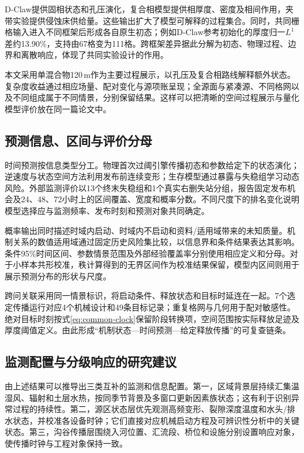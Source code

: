 D-Claw提供固相状态和孔压演化，复合相模型提供相厚度、密度及相间作用，夹带实验提供侵蚀床供给量。这些输出扩大了模型可解释的过程集合。同时，共同栅格输入进入不同框架后形成各自原生初态；例如D-Claw参考初始化的厚度归一$L^1$差约13.90\%，支持由67格变为111格。跨框架差异据此分解为初态、物理过程、边界和离散响应，体现了共同实验设计的作用。

本文采用单混合物120\,m作为主要过程展示，以孔压及复合相路线解释额外状态。复杂度收益通过相应场量、配对变化与源项账呈现；全源面与紧凑源、不同格网以及不同组成属于不同情景，分别保留结果。这样可以把清晰的空间过程展示与量化模型评价放在同一篇论文中。

\subsection{预测信息、区间与评价分母}
时间预测按信息类型分工。物理首次过阈引擎传播初态和参数给定下的状态演化；逆速度与状态空间方法利用发布前连续变形；生存模型通过暴露与失稳组学习动态风险。外部监测评价以13个终末失稳组和1个真实右删失站分组，报告固定发布机会及24、48、72小时上的区间覆盖、宽度和概率分数。不同尺度下的排名变化说明模型选择应与监测频率、发布时刻和预测对象共同确定。

概率输出同时描述时域内启动、时域内不启动和资料/适用域带来的未知质量。机制关系的数值适用域通过固定历史风险集比较，以信息界和条件结果表达其影响。条件95\%时间区间、参数情景范围及外部经验覆盖率分别使用相应定义和分母。对于小样本共形校准，秩计算得到的无界区间作为校准结果保留，模型内区间则用于展示预测分布的形状与尺度。

跨问关联采用同一情景标识，将启动条件、释放状态和目标时延连在一起。7个选定传播运行对应4个机械设计和49条目标记录；重复格网与几何用于配对敏感性。绝对目标时刻按式\eqref{eq:common-clock}保留阶段转换项，空间范围按实际释放足迹及厚度阈值定义。由此形成“机制状态—时间预测—给定释放传播”的可复查链条。

\subsection{监测配置与分级响应的研究建议}
由上述结果可以推导出三类互补的监测和信息配置。第一，区域背景层持续汇集温湿风、辐射和土层水热，按同季节背景及多窗口更新因素族状态；这有利于识别异常过程的持续性。第二，源区状态层优先观测高频变形、裂隙深度温度和水头/排水状态，并校准各设备时钟；它们直接对应机械启动方程及可辨识性分析中的关键状态。第三，沟谷传播层围绕入河位置、汇流段、桥位和设施分别设置响应对象，使传播时钟与工程对象保持一致。

